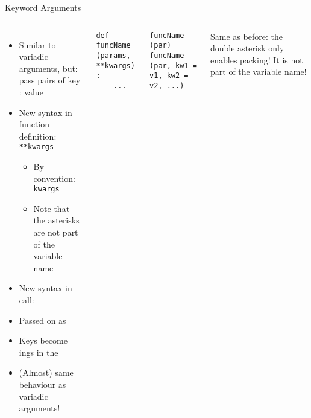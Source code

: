 \begin{frame}[fragile]{Keyword Arguments}
%
\vspace{-17pt}
\begin{columns}[t]
\begin{itemize}
\item Similar to variadic arguments, but: pass pairs of key : value
\item New syntax in function definition: \texttt{**kwargs}
	\begin{itemize}
	\item By convention: \texttt{kwargs}
	\item Note that the asterisks are not part of the variable name
	\end{itemize}
\item New syntax in call: 
\item Passed on as 
\item Keys become ings in the 
\item[\Thus] (Almost) same behaviour as variadic arguments!
\end{itemize}
%
\begin{codebox}
\begin{verbatim}
def funcName (params, **kwargs) :
    ...
\end{verbatim}
\end{codebox}
%
\begin{codebox}
\begin{verbatim}
funcName (par)
funcName (par, kw1 = v1, kw2 = v2, ...)
\end{verbatim}
\end{codebox}
%
\begin{hintbox}
\small
Same as before: the double asterisk only enables packing! It is not part of the variable name!
\end{hintbox}
\end{columns}
%
\end{frame}


